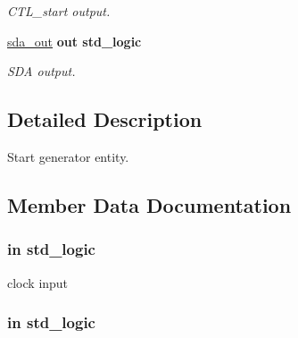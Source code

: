 \begin{DoxyCompactItemize}
\begin{DoxyCompactList}\small\item\em C\+T\+L\+\_\+start output. \end{DoxyCompactList}\item 
\hyperlink{classstart__generator_a225745186aee8a36d9f0f5a266e3ea6e}{sda\+\_\+out}  {\bfseries {\bfseries \textcolor{vhdlchar}{out}\textcolor{vhdlchar}{ }}} {\bfseries \textcolor{vhdlchar}{std\+\_\+logic}\textcolor{vhdlchar}{ }} 
\begin{DoxyCompactList}\small\item\em S\+DA output. \end{DoxyCompactList}\end{DoxyCompactItemize}


\subsection{Detailed Description}
Start generator entity. 

\subsection{Member Data Documentation}
\subsubsection[{\texorpdfstring{clk}{clk}}]{ {\bfseries \textcolor{vhdlchar}{in}\textcolor{vhdlchar}{ }} {\bfseries \textcolor{vhdlchar}{std\+\_\+logic}\textcolor{vhdlchar}{ }} \hspace{0.3cm}{\ttfamily [Port]}}\hypertarget{classstart__generator_a4a4609c199d30b3adebbeb3a01276ec5}{}\label{classstart__generator_a4a4609c199d30b3adebbeb3a01276ec5}


clock input 

\subsubsection[{\texorpdfstring{clk\+\_\+ena}{clk_ena}}]{ {\bfseries \textcolor{vhdlchar}{in}\textcolor{vhdlchar}{ }} {\bfseries \textcolor{vhdlchar}{std\+\_\+logic}\textcolor{vhdlchar}{ }} \hspace{0.3cm}{\ttfamily [Port]}}\hypertarget{classstart__generator_a373faa4fdd1aebdfb0b95d5d53da4434}{}\label{classstart__generator_a373faa4fdd1aebdfb0b95d5d53da4434}


